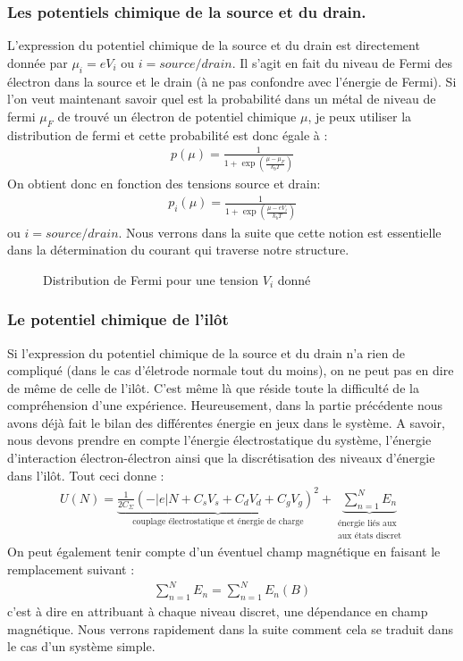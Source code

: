 \subsubsection{Les potentiels chimique de la source et du drain.}
L'expression du potentiel chimique de la source et du drain est directement donnée par $\mu_i = e V_i$ ou $i=source/drain$. Il s'agit en fait du niveau de Fermi des électron dans la source et le drain (à ne pas confondre avec l'énergie de Fermi). Si l'on veut maintenant savoir quel est la probabilité dans un métal de niveau de fermi $\mu_F$ de trouvé un électron de potentiel chimique $\mu$, je peux utiliser la distribution de fermi et cette probabilité est donc égale à :
\begin{eqnarray}
p(\mu) = \frac{1}{1 + \exp{(\frac{\mu - \mu_F}{k_bT})}} \nonumber
\end{eqnarray}
 On obtient donc en fonction des tensions source et drain:
\begin{eqnarray}
p_i(\mu) = \frac{1}{1 + \exp{(\frac{\mu - eV_i}{k_bT})}}
\end{eqnarray}
ou $i=source/drain$. Nous verrons dans la suite que cette notion est essentielle dans la détermination du courant qui traverse notre structure.

\begin{figure}
\caption{Distribution de Fermi pour une tension $V_i$ donné}
\label{distrib_fermi}
\end{figure}



\subsubsection{Le potentiel chimique de l'il\^ot}
Si l'expression du potentiel chimique de la source et du drain n'a rien de compliqué (dans le cas d'életrode normale tout du moins), on ne peut pas en dire de m\^eme de celle de l'il\^ot. C'est m\^eme là que réside toute la difficulté de la compréhension d'une expérience. Heureusement, dans la partie précédente nous avons déjà fait le bilan des différentes énergie en jeux dans le système. A savoir, nous devons prendre en compte l'énergie électrostatique du système, l'énergie d'interaction électron-électron ainsi que la discrétisation des niveaux d'énergie dans l'il\^ot. Tout ceci donne :
\begin{eqnarray}
U(N) = \underbrace{\frac{1}{2C_{\Sigma}} (-|e|N + C_sV_s + C_dV_d + C_gV_g)^2}_{\text{couplage électrostatique et énergie de charge}}
+ 
\underbrace{\sum_{n=1}^{N} E_n}_{\substack{\text{énergie liés aux} \\\text{aux états discret}}}
\end{eqnarray}
On peut également tenir compte d'un éventuel champ magnétique en faisant le remplacement suivant :
\begin{eqnarray}
\sum_{n=1}^N E_n = \sum_{n=1}^N E_n(B) \nonumber
\end{eqnarray}
c'est à dire en attribuant à chaque niveau discret, une dépendance en champ magnétique. Nous verrons rapidement dans la suite comment cela se traduit dans le cas d'un système simple. 

